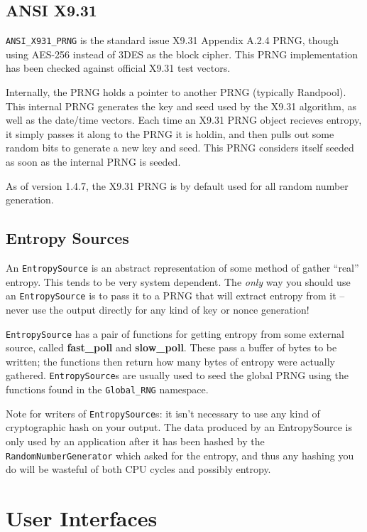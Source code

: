 \documentclass{article}
\newcommand{\function}[1]{\textbf{#1}}
\newcommand{\type}[1]{\texttt{#1}}
\newcommand{\namespace}[1]{\texttt{#1}}
\begin{document}
\subsection{ANSI X9.31}

\type{ANSI\_X931\_PRNG} is the standard issue X9.31 Appendix A.2.4 PRNG, though
using AES-256 instead of 3DES as the block cipher. This PRNG implementation has
been checked against official X9.31 test vectors.

Internally, the PRNG holds a pointer to another PRNG (typically Randpool). This
internal PRNG generates the key and seed used by the X9.31 algorithm, as well
as the date/time vectors. Each time an X9.31 PRNG object recieves entropy, it
simply passes it along to the PRNG it is holdin, and then pulls out some random
bits to generate a new key and seed. This PRNG considers itself seeded as soon
as the internal PRNG is seeded.

As of version 1.4.7, the X9.31 PRNG is by default used for all random number
generation.

\subsection{Entropy Sources}

An \type{EntropySource} is an abstract representation of some method of gather
``real'' entropy. This tends to be very system dependent. The \emph{only} way
you should use an \type{EntropySource} is to pass it to a PRNG that will
extract entropy from it -- never use the output directly for any kind of key or
nonce generation!

\type{EntropySource} has a pair of functions for getting entropy from some
external source, called \function{fast\_poll} and \function{slow\_poll}. These
pass a buffer of bytes to be written; the functions then return how many bytes
of entropy were actually gathered. \type{EntropySource}s are usually used to
seed the global PRNG using the functions found in the \namespace{Global\_RNG}
namespace.

Note for writers of \type{EntropySource}s: it isn't necessary to use any kind
of cryptographic hash on your output. The data produced by an EntropySource is
only used by an application after it has been hashed by the
\type{RandomNumberGenerator} which asked for the entropy, and thus any hashing
you do will be wasteful of both CPU cycles and possibly entropy.

\pagebreak

\section{User Interfaces}
\end{document}
